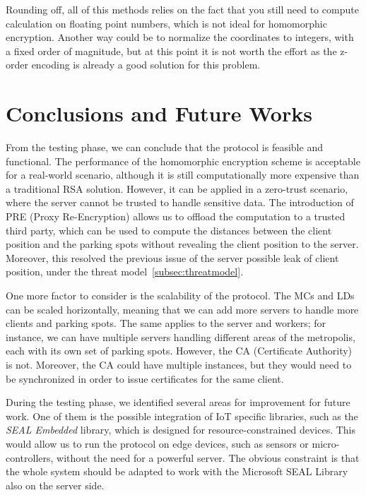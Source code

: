 Rounding off, all of this methods relies on the fact that you still need to compute calculation on floating point numbers, which is not ideal for homomorphic encryption. Another way could be to normalize the coordinates to integers, with a fixed order of magnitude, but at this point it is not worth the effort as the z-order encoding is already a good solution for this problem.


\section{Conclusions and Future Works}

From the testing phase, we can conclude that the protocol is feasible and functional. The performance of the homomorphic encryption scheme is acceptable for a real-world scenario, although it is still computationally more expensive than a traditional RSA solution. However, it can be applied in a zero-trust scenario, where the server cannot be trusted to handle sensitive data. The introduction of PRE (Proxy Re-Encryption) allows us to offload the computation to a trusted third party, which can be used to compute the distances between the client position and the parking spots without revealing the client position to the server. Moreover, this resolved the previous issue of the server possible leak of client position, under the threat model~\cref{subsec:threatmodel}.

One more factor to consider is the scalability of the protocol. The MCs and LDs can be scaled horizontally, meaning that we can add more servers to handle more clients and parking spots. The same applies to the server and workers; for instance, we can have multiple servers handling different areas of the metropolis, each with its own set of parking spots. However, the CA (Certificate Authority) is not. Moreover, the CA could have multiple instances, but they would need to be synchronized in order to issue certificates for the same client.

During the testing phase, we identified several areas for improvement for future work. One of them is the possible integration of IoT specific libraries, such as the \emph{SEAL Embedded} \cite{sealembedded} library, which is designed for resource-constrained devices. This would allow us to run the protocol on edge devices, such as sensors or micro-controllers, without the need for a powerful server. The obvious constraint is that the whole system should be adapted to work with the Microsoft SEAL\cite{sealcrypto} Library also on the server side. 

